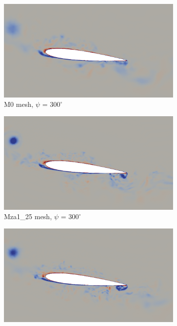\begin{figure}[H]
	\centering
	\begin{center}
		\begin{subfigure}[b]{0.475\textwidth}
			\centering
			\includegraphics[width=1\textwidth]{figures/zonal_adapt_results/vorticity_plots_Re200k/M0/phase_300.png}
			\caption{M0 mesh, $\psi$ = $300^\circ$}
			\label{fig:M0_Re200k_sp_psi300}
		\end{subfigure}
	\end{center}
	\begin{subfigure}[b]{0.475\textwidth}
		\centering
		\includegraphics[width=1\textwidth]{figures/zonal_adapt_results/vorticity_plots_Re200k/Mza1_50/phase_300.png}
		\caption{Mza1\_25 mesh, $\psi$ = $300^\circ$}
		\label{fig:Mza1_50_Re200k_sp_psi300}
	\end{subfigure}
	\begin{subfigure}[b]{0.475\textwidth}
		\centering
		\includegraphics[width=1\textwidth]{figures/zonal_adapt_results/vorticity_plots_Re200k/Mza1_100/phase_300.png}

\end{subfigure}
\end{figure}
